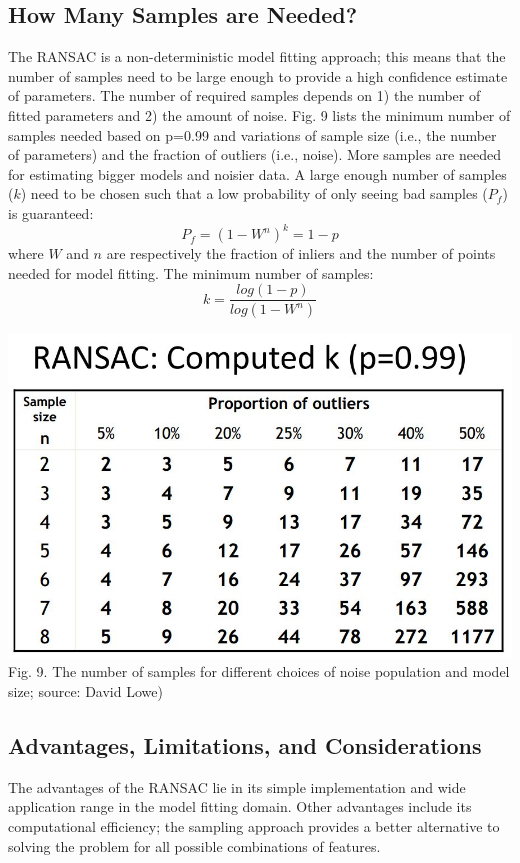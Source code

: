 \documentclass{article}
\begin{document}
\subsection{How Many Samples are Needed?}
The RANSAC is a non-deterministic model fitting approach; this means that the number of samples need to be large enough to provide a high confidence estimate of parameters. The number of required samples depends on 1) the number of fitted parameters and 2) the amount of noise. Fig. 9 lists the minimum number of samples needed based on p=0.99 and variations of sample size (i.e., the number of parameters) and the fraction of outliers (i.e., noise). More samples are needed for estimating bigger models and noisier data.
A large enough number of samples ($k$) need to be chosen such that a low probability of only seeing bad samples (${P_f}$) is guaranteed:
$${P_f}= (1-W^n)^k= 1-p$$
where $W$ and $n$ are respectively the fraction of inliers and the number of points needed for model fitting. The minimum number of samples:
$$k=\frac{log(1-p)}{log(1-W^n)}$$

\includegraphics[width=\textwidth]{ransac4.jpg}
Fig. 9. The number of samples for different choices of noise population and model size; source: David Lowe)

\subsection{Advantages, Limitations, and Considerations}
The advantages of the RANSAC lie in its simple implementation and wide application range in the model fitting domain. Other advantages include its computational efficiency; the sampling approach provides a better alternative to solving the problem for all possible combinations of features.
\end{document}
